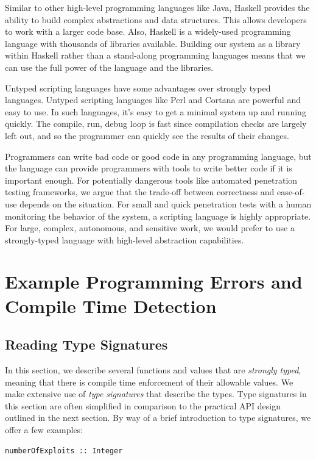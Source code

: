 \documentclass[figure,letterpaper,onefignum]{mysiam}
\begin{document}
Similar to other high-level programming languages like Java, Haskell provides the ability to build complex abstractions and data structures. This allows developers to work with a larger code base. Also, Haskell is a widely-used programming language with thousands of libraries available. Building our system as a library within Haskell rather than a stand-along programming languages means that we can use the full power of the language and the libraries.

Untyped scripting languages have some advantages over strongly typed languages. Untyped scripting languages like Perl and Cortana are powerful and easy to use. In such languages, it's easy to get a minimal system up and running quickly. The compile, run, debug loop is fast since compilation checks are largely left out, and so the programmer can quickly see the results of their changes.

Programmers can write bad code or good code in any programming language, but the language can provide programmers with tools to write better code if it is important enough. For potentially dangerous tools like automated penetration testing frameworks, we argue that the trade-off between correctness and ease-of-use depends on the situation. For small and quick penetration tests with a human monitoring the behavior of the system, a scripting language is highly appropriate.  For large, complex, autonomous, and sensitive work, we would prefer to use a strongly-typed language with high-level abstraction capabilities.

\appendix
\section{Example Programming Errors and Compile Time Detection}
\label{secExampleErrors}
\subsection{Reading Type Signatures}
In this section, we describe several functions and values that are \emph{strongly typed}, meaning that there is compile time enforcement of their allowable values. We make extensive use of \emph{type signatures} that describe the types. Type signatures in this section are often simplified in comparison to the practical API design outlined in the next section. By way of a brief introduction to type signatures, we offer a few examples:

\begin{verbatim}
numberOfExploits :: Integer
\end{verbatim}
\end{document}
